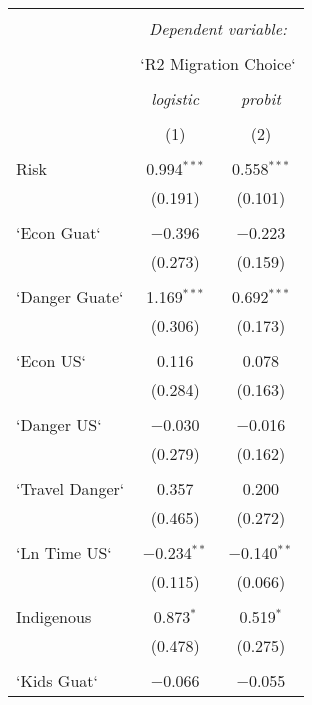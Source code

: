 
\begin{table}[!htbp] \centering 
  \caption{} 
  \label{} 
\begin{tabular}{@{\extracolsep{5pt}}lcc} 
\\[-1.8ex]\hline 
\hline \\[-1.8ex] 
 & \multicolumn{2}{c}{\textit{Dependent variable:}} \\ 
\cline{2-3} 
\\[-1.8ex] & \multicolumn{2}{c}{`R2 Migration Choice`} \\ 
\\[-1.8ex] & \textit{logistic} & \textit{probit} \\ 
\\[-1.8ex] & (1) & (2)\\ 
\hline \\[-1.8ex] 
 Risk & 0.994$^{***}$ & 0.558$^{***}$ \\ 
  & (0.191) & (0.101) \\ 
  & & \\ 
 `Econ Guat` & $-$0.396 & $-$0.223 \\ 
  & (0.273) & (0.159) \\ 
  & & \\ 
 `Danger Guate` & 1.169$^{***}$ & 0.692$^{***}$ \\ 
  & (0.306) & (0.173) \\ 
  & & \\ 
 `Econ US` & 0.116 & 0.078 \\ 
  & (0.284) & (0.163) \\ 
  & & \\ 
 `Danger US` & $-$0.030 & $-$0.016 \\ 
  & (0.279) & (0.162) \\ 
  & & \\ 
 `Travel Danger` & 0.357 & 0.200 \\ 
  & (0.465) & (0.272) \\ 
  & & \\ 
 `Ln Time US` & $-$0.234$^{**}$ & $-$0.140$^{**}$ \\ 
  & (0.115) & (0.066) \\ 
  & & \\ 
 Indigenous & 0.873$^{*}$ & 0.519$^{*}$ \\ 
  & (0.478) & (0.275) \\ 
  & & \\ 
 `Kids Guat` & $-$0.066 & $-$0.055 \\ 

\end{tabular}
\end{table}
